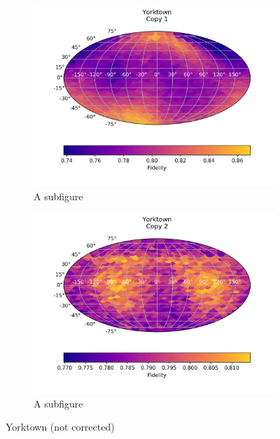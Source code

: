 \begin{figure}[H]
    \centering
    \begin{subfigure}{.5\textwidth}
      \centering
      \includegraphics[width=\textwidth]{Figures/PhaseCovariant/IBM/FullSphere/results_ibmqx2.txt_copy1.png}
      \caption{A subfigure}
      \label{fig:pc_yorktown_sphere_1}
    \end{subfigure}%
    \begin{subfigure}{.5\textwidth}
      \centering
      \includegraphics[width=\textwidth]{Figures/PhaseCovariant/IBM/FullSphere/results_ibmqx2.txt_copy2.png}
      \caption{A subfigure}
      \label{fig:pc_yorktown_sphere_2}
    \end{subfigure}
    \caption{Yorktown (not corrected)}
    \label{fig:pc_yorktown_sphere}
\end{figure}

